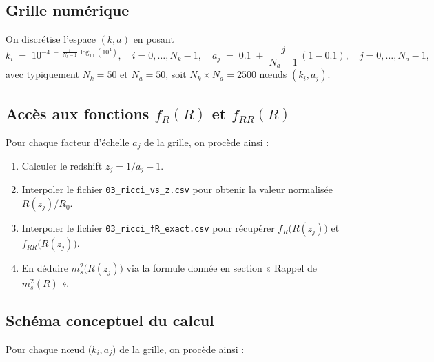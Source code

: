 \subsection{Grille numérique}
On discrétise l’espace \((k,a)\) en posant
\[
  k_{i} \;=\; 10^{-4 \;+\;\frac{i}{N_{k}-1}\,\log_{10}(10^{4})},
  \quad
  i=0,\dots,N_{k}-1,
  \quad
  a_{j} \;=\; 0.1 \;+\;\frac{j}{N_{a}-1}\,(1 - 0.1),
  \quad
  j=0,\dots,N_{a}-1,
\]
avec typiquement \(N_{k}=50\) et \(N_{a}=50\), soit \(N_{k}\times N_{a}=2500\) nœuds \((k_{i},a_{j})\).

\subsection{Accès aux fonctions \(f_{R}(R)\) et \(f_{RR}(R)\)}
Pour chaque facteur d’échelle \(a_{j}\) de la grille, on procède ainsi :
\begin{enumerate}
  \item Calculer le redshift \(z_{j} = 1/a_{j} - 1\).
  \item Interpoler le fichier \texttt{03\_ricci\_vs\_z.csv} pour obtenir la valeur normalisée \(R(z_{j})/R_{0}\).
  \item Interpoler le fichier \texttt{03\_ricci\_fR\_exact.csv} pour récupérer \(f_{R}\bigl(R(z_{j})\bigr)\) et \(f_{RR}\bigl(R(z_{j})\bigr)\).
  \item En déduire \(m_{s}^{2}\bigl(R(z_{j})\bigr)\) via la formule donnée en section « Rappel de \(m_{s}^{2}(R)\) ».
\end{enumerate}

\subsection{Schéma conceptuel du calcul}
Pour chaque nœud \(\bigl(k_{i},a_{j}\bigr)\) de la grille, on procède ainsi :

